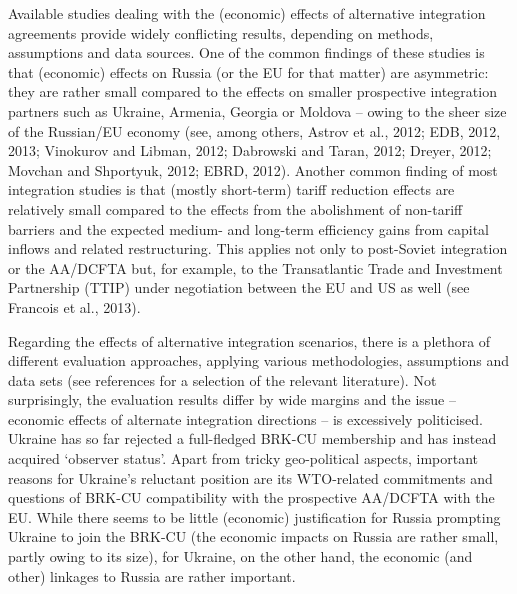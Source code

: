 Available studies dealing with the (economic) effects of alternative integration agreements provide widely conflicting results, depending on methods, assumptions and data sources. One of the common findings of these studies is that (economic) effects on Russia (or the EU for that matter) are asymmetric: they are rather small compared to the effects on smaller prospective integration partners such as Ukraine, Armenia, Georgia or Moldova -- owing to the sheer size of the Russian/EU economy (see, among others, Astrov et al., 2012; EDB, 2012, 2013; Vinokurov and Libman, 2012; Dabrowski and Taran, 2012; Dreyer, 2012; Movchan and Shportyuk, 2012; EBRD, 2012). Another common finding of most integration studies is that (mostly short-term) tariff reduction effects are relatively small compared to the effects from the abolishment of non-tariff barriers and the expected medium- and long-term efficiency gains from capital inflows and related restructuring. This applies not only to post-Soviet integration or the AA/DCFTA but, for example, to the Transatlantic Trade and Investment Partnership (TTIP) under negotiation between the EU and US as well (see Francois et al., 2013).

Regarding the effects of alternative integration scenarios, there is a plethora of different evaluation approaches, applying various methodologies, assumptions and data sets (see references for a selection of the relevant literature). Not surprisingly, the evaluation results differ by wide margins and the issue -- economic effects of alternate integration directions -- is excessively politicised. Ukraine has so far rejected a full-fledged BRK-CU membership and has instead acquired `observer status'. Apart from tricky geo-political aspects, important reasons for Ukraine's reluctant position are its WTO-related commitments and questions of BRK-CU compatibility with the prospective AA/DCFTA with the EU. While there seems to be little (economic) justification for Russia prompting Ukraine to join the BRK-CU (the economic impacts on Russia are rather small, partly owing to its size), for Ukraine, on the other hand, the economic (and other) linkages to Russia are rather important.

\clearpage\newpage

